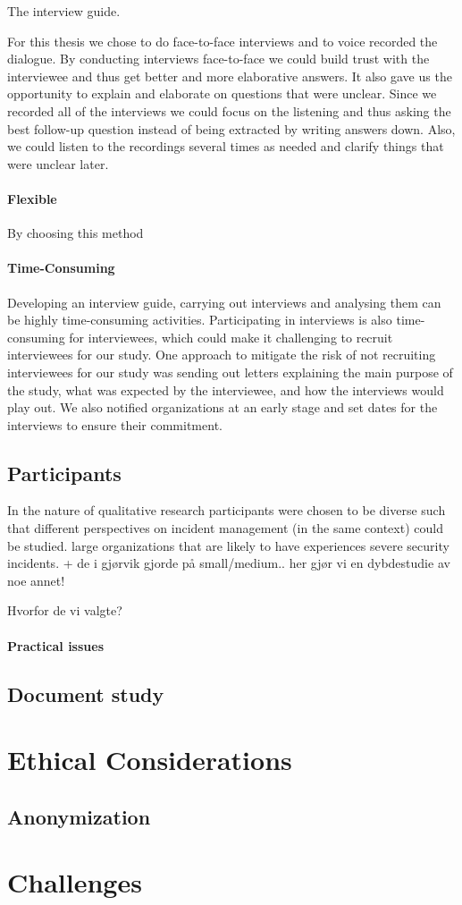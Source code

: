The interview guide. 

For this thesis we chose to do face-to-face interviews and to voice recorded the dialogue. 
By conducting interviews face-to-face we could build trust with the interviewee and thus get better and more elaborative answers. It also gave us the opportunity to explain and elaborate on questions that were unclear. Since we recorded all of the interviews we could focus on the listening and thus asking the best follow-up question instead of being extracted by writing answers down. Also, we could listen to the recordings several times as needed and clarify things that were unclear later.

\paragraph{Flexible} By choosing this method

\paragraph{Time-Consuming} Developing an interview guide, carrying out interviews and analysing them can be highly time-consuming activities. Participating in interviews is also time-consuming for interviewees, which could make it challenging to recruit interviewees for our study. One approach to mitigate the risk of not recruiting interviewees for our study was sending out letters explaining the main purpose of the study, what was expected by the interviewee, and how the interviews would play out. We also notified organizations at an early stage and set dates for the interviews to ensure their commitment.


\subsection{Participants}
In the nature of qualitative research participants were chosen to be diverse such that different perspectives on incident management (in the same context) could be studied.
large organizations that are likely to have experiences severe security incidents. + de i gjørvik gjorde på small/medium.. her gjør vi en dybdestudie av noe annet!

Hvorfor de vi valgte?

\paragraph{Practical issues}
\subsection{Document study}
\section{Ethical Considerations}
\subsection{Anonymization}
\section{Challenges}

